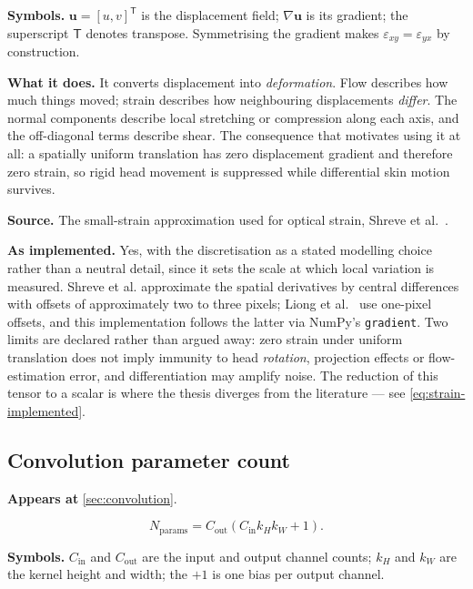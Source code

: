 \textbf{Symbols.} $\mathbf{u}=[u,v]^{\mathsf T}$ is the displacement field;
$\nabla\mathbf{u}$ is its gradient; the superscript $\mathsf{T}$ denotes
transpose. Symmetrising the gradient makes $\varepsilon_{xy}=\varepsilon_{yx}$
by construction.

\textbf{What it does.} It converts displacement into \emph{deformation}.
Flow describes how much things moved; strain describes how neighbouring
displacements \emph{differ}. The normal components describe local stretching or
compression along each axis, and the off-diagonal terms describe shear. The
consequence that motivates using it at all: a spatially uniform translation
has zero displacement gradient and therefore zero strain, so rigid head
movement is suppressed while differential skin motion survives.

\textbf{Source.} The small-strain approximation used for optical strain,
Shreve et al.~\cite{shreve2011}.

\textbf{As implemented.} Yes, with the discretisation as a stated modelling
choice rather than a neutral detail, since it sets the scale at which local
variation is measured. Shreve et al. approximate the spatial derivatives by
central differences with offsets of approximately two to three pixels; Liong
et al.~\cite{liong2014a} use one-pixel offsets, and this implementation
follows the latter via NumPy's \texttt{gradient}. Two limits are declared
rather than argued away: zero strain under uniform translation does not imply
immunity to head \emph{rotation}, projection effects or flow-estimation error,
and differentiation may amplify noise. The reduction of this tensor to a
scalar is where the thesis diverges from the literature --- see
\autoref{eq:strain-implemented}.

\subsection{Convolution parameter count}
\label{eq:conv-params}

\textbf{Appears at} \autoref{sec:convolution}.

\[
    N_{\mathrm{params}}=C_{\mathrm{out}}
       (C_{\mathrm{in}}k_Hk_W+1).
\]

\textbf{Symbols.} $C_{\mathrm{in}}$ and $C_{\mathrm{out}}$ are the input and
output channel counts; $k_H$ and $k_W$ are the kernel height and width; the
$+1$ is one bias per output channel.

